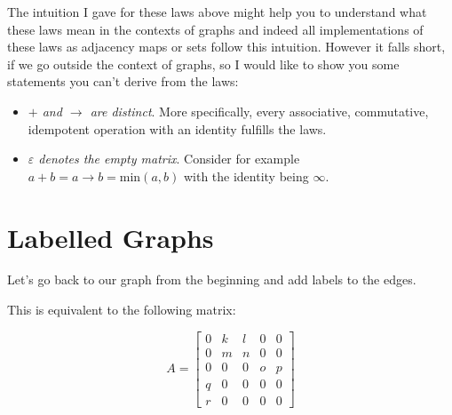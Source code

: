 \documentclass[a4paper,twocolumn]{article}
\begin{document}
The intuition I gave for these laws above might help you to understand what these laws mean in the contexts of graphs
and indeed all implementations of these laws as adjacency maps or sets follow this intuition.
However it falls short, if we go outside the context of graphs, so I would like to show you some statements you can't derive from the laws:
\begin{itemize}
\item \textit{$+$ and $\xrightarrow{}$ are distinct}. More specifically,
  every associative, commutative, idempotent operation with an identity fulfills the laws.
\item \textit{$\varepsilon$ denotes the empty matrix}. Consider for example $a + b = a \xrightarrow{} b = \text{min}(a,b)$
  with the identity being $\infty$.
\end{itemize}

\section{Labelled Graphs}

Let's go back to our graph from the beginning and add labels to the edges.

\begin{center}
\end{center}

This is equivalent to the following matrix:

\[ A=
\begin{bmatrix}
  0 & k & l & 0 & 0 \\
  0 & m & n & 0 & 0 \\
  0 & 0 & 0 & o & p \\
  q & 0 & 0 & 0 & 0 \\
  r & 0 & 0 & 0 & 0
\end{bmatrix}
\]
\end{document}
